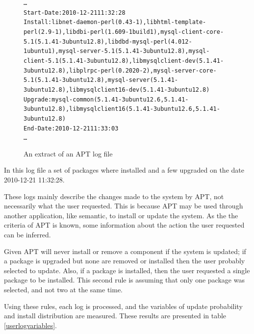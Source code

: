 \begin{figure}[htp]
\begin{center}
\begin{alltt}
\ldots
Start-Date: 2010-12-21 11:32:28
Install: libnet-daemon-perl (0.43-1), libhtml-template-perl (2.9-1), libdbi-perl (1.609-1build1), mysql-client-core-5.1 (5.1.41-3ubuntu12.8), libdbd-mysql-perl (4.012-1ubuntu1), mysql-server-5.1 (5.1.41-3ubuntu12.8), mysql-client-5.1 (5.1.41-3ubuntu12.8), libmysqlclient-dev (5.1.41-3ubuntu12.8), libplrpc-perl (0.2020-2), mysql-server-core-5.1 (5.1.41-3ubuntu12.8), mysql-server (5.1.41-3ubuntu12.8), libmysqlclient16-dev (5.1.41-3ubuntu12.8)
Upgrade: mysql-common (5.1.41-3ubuntu12.6, 5.1.41-3ubuntu12.8), libmysqlclient16 (5.1.41-3ubuntu12.6, 5.1.41-3ubuntu12.8)
End-Date: 2010-12-21 11:33:03
\ldots
\end{alltt}
\caption[APT log extract]{An extract of an APT log file}
\label{aptlog}
\end{center}
\end{figure}

In this log file a set of packages where installed and a few upgraded on the date 2010-12-21 11:32:28. 

These logs mainly describe the changes made to the system by APT, not necessarily what the user requested.
This is because APT may be used through another application, like semantic, to install or update the system.
As the the criteria of APT is known, some information about the action the user requested can be inferred.

Given APT will never install or remove a component if the system is updated; 
if a package is upgraded but none are removed or installed then the user probably selected to update.
Also, if a package is installed, then the user requested a single package to be installed.
This second rule is assuming that only one package was selected, and not two at the same time.

Using these rules, each log is processed, and the variables of update probability and install distribution are measured.
These results are presented in table \ref{userlogvariables}.

